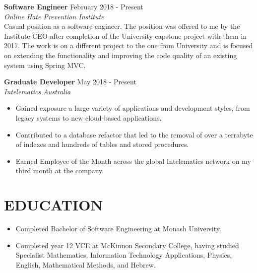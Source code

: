 \documentclass[margin, 10pt]{res} %
\begin{document}
\begin{resume}
\textbf{Software Engineer} \hfill February 2018 - Present \\
{\sl Online Hate Prevention Institute} \\
Casual position as a software engineer. The position was offered to me by the Institute CEO after completion of the University capstone project with them in 2017. The work is on a different project to the one from University and is focused on extending the functionality and improving the code quality of an existing system using Spring MVC.

\textbf{Graduate Developer} \hfill May 2018 - Present \\
{\sl Intelematics Australia} \\
\begin{itemize}

\item Gained exposure a large variety of applications and development styles, from legacy systems to new cloud-based applications.
\item Contributed to a database refactor that led to the removal of over a terrabyte of indexes and hundreds of tables and stored procedures.
\item Earned Employee of the Month across the global Intelematics network on my third month at the company.

\end{itemize} 


\section{EDUCATION}

\begin{itemize}

\item Completed Bachelor of Software Engineering at Monash University. %
\item Completed year 12 VCE at McKinnon Secondary College, having studied Specialist  Mathematics, Information Technology Applications, Physics, English, Mathematical Methods, and Hebrew.


\end{itemize}
\end{resume}
\end{document}
